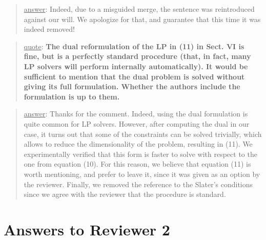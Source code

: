 \documentclass[a4paper]{article}
\newcommand\quot[1]{\begin{quote} \underline{quote}: \textbf{#1}\end{quote}}
\newcommand\as[1]{\begin{quote} \underline{answer}: {#1}\end{quote} }
\begin{document}
\as{Indeed, due to a misguided merge, the sentence was reintroduced against our will. We apologize for that, and guarantee that this time it was indeed removed!}

\quot {
The dual reformulation of the LP in (11) in Sect. VI is fine, but is
a perfectly standard procedure (that, in fact, many LP solvers will
perform internally automatically). It would be sufficient to mention
that the dual problem is solved without giving its full formulation.
Whether the authors include the formulation is up to them.}

\as{Thanks for the comment. Indeed, using the dual formulation is quite common for LP solvers. However, after computing the dual in our case, it turns out that some of the constraints can be solved trivially, which allows to reduce the dimensionality of the problem, resulting in (11). We experimentally verified that this form is faster to solve with respect to the one from equation (10). For this reason, we believe that equation (11) is worth mentioning, and prefer to leave it, since it was given as an option by the reviewer. Finally, we removed the reference to the Slater's conditions since we agree with the reviewer that the procedure is standard.}

\section{Answers to Reviewer 2}
\end{document}
